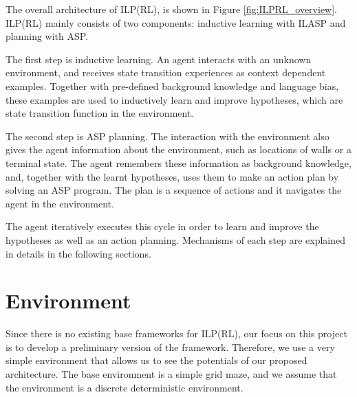 
The overall architecture of ILP(RL), is shown in Figure \ref{fig:ILPRL_overview}. 
ILP(RL) mainly consists of two components: inductive learning with ILASP and planning with ASP. 

The first step is inductive learning. An agent interacts with an unknown environment, 
and receives state transition experiences as context dependent examples. 
Together with pre-defined background knowledge and language bias, these examples are used to inductively learn and improve hypotheses, which are state transition function in the environment.

The second step is ASP planning. The interaction with the environment also gives the agent information about the environment, such as locations of walls or a terminal state. 
The agent remembers these information as background knowledge, and, 
together with the learnt hypotheses, uses them to make an action plan by solving an ASP program.
The plan is a sequence of actions and it navigates the agent in the environment.

The agent iteratively executes this cycle in order to learn and improve the hypotheses as well as an action planning. 
Mechanisms of each step are explained in details in the following sections.

\section{Environment}
\label{sec:environment}
Since there is no existing base frameworks for ILP(RL), our focus on this project is to develop a preliminary version of the framework. 
Therefore, we use a very simple environment that allows us to see the potentials of our proposed architecture.
The base environment is a simple grid maze, and we assume that the environment is a discrete deterministic environment. 

